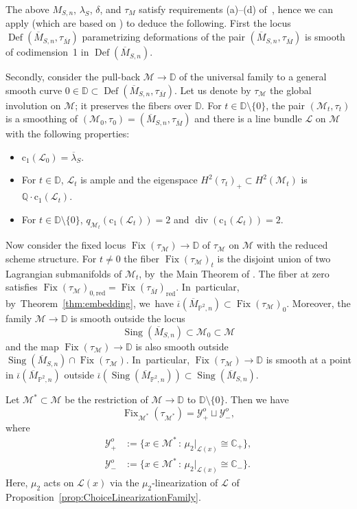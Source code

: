 \documentclass[11pt]{article}
\newcommand{\CC}{{\mathbb C}}\let\C\CC
\newcommand{\DD}{{\mathbb D}}
\newcommand{\PP}{{\mathbb P}}\let\P\PP
\newcommand{\QQ}{{\mathbb Q}}\let\Q\QQ
\newcommand\cL{\mathcal{L}}
\newcommand\cM{\mathcal{M}}
\newcommand\cY{\mathcal{Y}}
\DeclareMathOperator{\Def}{Def}
\DeclareMathOperator{\divisore}{div}\let\div\divisore
\DeclareMathOperator{\Fix}{Fix}
\DeclareMathOperator{\Sing}{Sing}
\theoremstyle{definition}
\begin{document}
The above $M_{S,n}$, $\lambda_S$, $\delta$, and $\tau_M$ satisfy requirements (a)--(d) of~\cite[\S 2]{involutions1}, hence we can apply \cite[Prop.\,2.1 \& Cor.\,2.2]{involutions1} (which are based on \cite{Namikawa:Def, markman:modular}) to deduce the following.
First the locus $\Def(\overline{M}_{S,n},\tau_{\overline{M}})$ parametrizing deformations of the pair $(\overline{M}_{S,n},\tau_{\overline{M}})$ is smooth of codimension~1 in $\Def(\overline{M}_{S,n})$.

Secondly, consider the pull-back $\mathcal{M}\to \DD$ of the universal family to a general smooth curve $0\in \DD\subset \Def(\overline{M}_{S,n},\tau_{\overline{M}})$.
Let us denote by $\tau_{\mathcal{M}}$ the global involution on $\mathcal{M}$; it preserves the fibers over $\DD$.
For $t\in \DD\setminus\{0\}$, the pair $(\mathcal{M}_t, \tau_t)$ is a smoothing of $(\mathcal{M}_0, \tau_0)=(\overline{M}_{S,n},\tau_{\overline{M}})$ and there is a line bundle $\cL$ on $\mathcal{M}$ with the following properties:
\begin{itemize}
\item $\mathrm{c}_1(\cL_0)=\overline{\lambda}{}_S$.
\item For $t\in \DD$, $\cL_t$ is ample and the eigenspace $H^2(\tau_t)_{+}\subset H^2(\mathcal{M}_t)$ is $\QQ\cdot \mathrm{c}_1(\cL_t)$.
\item For $t\in \DD\setminus\{0\}$, $q_{\cM_t}(\mathrm{c}_1(\cL_t))=2$ and $\divisore(\mathrm{c}_1(\cL_t))=2$.
\end{itemize}

Now consider the fixed locus $\Fix(\tau_{\cM})\to \DD$ of $\tau_{\cM}$ on $\cM$ with the reduced scheme structure.
For $t\ne0$ the fiber $\Fix(\tau_{\mathcal M})_t$ is the disjoint union of two Lagrangian submanifolds of $\cM_t$, by~the Main Theorem of \cite{involutions1}.
The fiber at zero satisfies $\Fix(\tau_{\mathcal M})_{0,\mathrm{red}}=\Fix(\tau_{\overline{M}})_{\mathrm{red}}$. In~particular, by~Theorem~\ref{thm:embedding}, we~have $\overline{\iota}(\overline{M}_{\PP^2,n})\subset \Fix(\tau_{\mathcal M})_0$.
Moreover, the family $\cM\to \DD$ is smooth outside the locus
\[
\Sing(\overline{M}_{S,n})\subset \cM_0 \subset \cM
\]
and the map $\Fix(\tau_{\cM})\to \DD$ is also smooth outside $\Sing(\overline{M}_{S,n})\cap \Fix(\tau_{\cM})$. In~particular, $\Fix(\tau_{\cM})\to \DD$ is smooth at a point in $\overline{\iota}(\overline{M}_{\PP^2,n})$ outside $\overline{\iota}(\Sing(\overline{M}_{\PP^2,n}))\subset \Sing(\overline{M}_{S,n})$.

Let $\cM^{*}\subset\cM$ be the restriction of $\cM\to\DD$ to $\DD\setminus\{0\}$.
Then we have
\[
\Fix_{\cM^{*}}(\tau_{\cM^{*}})= \cY^o_+ \sqcup \cY^o_-,
\]
where
\begin{equation*}
\begin{split}
\cY^o_+ &:=\{ x\in \cM^* \,:\, \mu_2|_{\cL(x)} \cong \CC_{+}\}, \\
\cY^o_- &:=\{ x\in \cM^* \,:\, \mu_2|_{\cL(x)} \cong \CC_{-}\}.
\end{split}
\end{equation*}
Here, $\mu_2$ acts on $\cL(x)$ via the $\mu_2$-linearization of $\cL$ of Proposition~\ref{prop:ChoiceLinearizationFamily}.
\end{document}
